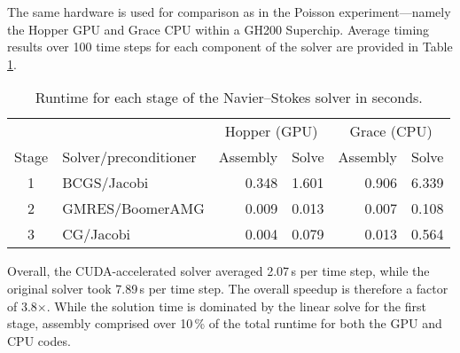 The same hardware is used for comparison as in the Poisson experiment---namely the Hopper GPU and Grace CPU within a GH200 Superchip. Average timing results over 100 time steps for each component of the solver are provided in Table \ref{tab:navier_stokes_results}.
\begin{table}[t]
    \centering
\begin{tabular}{clrrrr}
\toprule
      &                 & \multicolumn{2}{c}{Hopper (GPU)} & \multicolumn{2}{c}{Grace (CPU)} \\
                          \cmidrule(lr){3-4}               \cmidrule(lr){5-6}
Stage & Solver/preconditioner       & Assembly & Solve               & Assembly & Solve \\
\midrule
    1 & BCGS/Jacobi     &    0.348 &               1.601 &    0.906 & 6.339 \\
    2 & GMRES/BoomerAMG &    0.009 &               0.013 &    0.007 & 0.108 \\
    3 & CG/Jacobi       &    0.004 &               0.079 &    0.013 & 0.564 \\
\bottomrule
\end{tabular}
\caption{Runtime for each stage of the Navier--Stokes solver in seconds.}
    \label{tab:navier_stokes_results}
\end{table}
Overall, the CUDA-accelerated solver averaged 2.07\,s per time step, while the original solver took 7.89\,s per time step. The overall speedup is therefore a factor of 3.8${\times}$. While the solution time is dominated by the linear solve for the first stage, assembly comprised over 10\,\% of the total runtime for both the GPU and CPU codes.


